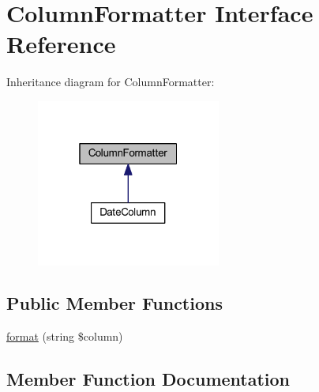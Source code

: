 \hypertarget{interfacehamburgscleanest_1_1_data_tables_1_1_interfaces_1_1_column_formatter}{}\section{Column\+Formatter Interface Reference}
\label{interfacehamburgscleanest_1_1_data_tables_1_1_interfaces_1_1_column_formatter}


Inheritance diagram for Column\+Formatter\+:
\nopagebreak
\begin{figure}[H]
\begin{center}
\leavevmode
\includegraphics[width=172pt]{interfacehamburgscleanest_1_1_data_tables_1_1_interfaces_1_1_column_formatter__inherit__graph}
\end{center}
\end{figure}
\subsection*{Public Member Functions}
\begin{DoxyCompactItemize}
\item 
\hyperlink{interfacehamburgscleanest_1_1_data_tables_1_1_interfaces_1_1_column_formatter_aba259f7ae8b25e70bd444020c04606e7}{format} (string \$column)
\end{DoxyCompactItemize}


\subsection{Member Function Documentation}
\mbox{\label{interfacehamburgscleanest_1_1_data_tables_1_1_interfaces_1_1_column_formatter_aba259f7ae8b25e70bd444020c04606e7}} 
